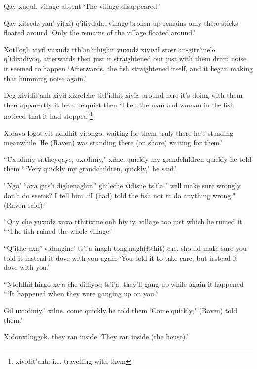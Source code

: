 \documentclass[12pt]{article}
\begin{document}
\gll Qay xuqul.
village absent
\glt `The village disappeared.'
\glend

\gll Qay xitsedz yan' yi(xi) q'itiydala.
village {broken-up remains} only there {sticks floated around}
\glt `Only the remains of the village floated around.'
\glend

\gll Xotl'ogh xiyiɬ yuxudz tth'an'ithighit yuxudz xiviyiɬ srosr an-gitr'inelo q'idixidiyoq.
afterwards then just {it straightened out} just {with them} drum noise {it seemed to happen}
\glt `Afterwards, the fish straightened itself, and it began making that humming noise again.'
\glend

\gll Deg xividit'anh xiyiɬ xizrolche titl'idhit xiyiɬ.
{around here} {it's doing with them} then apparently {it became quiet} then
\glt `Then the man and woman in the fish noticed that it had stopped.'\footnote{xividit'anh:  i.e. travelling with them}
\glend

\gll Xidavo ɬogot yit ndidhit yitongo.
{waiting for them} truly there {he's standing} meanwhile
\glt `He (Raven) was standing there (on shore) waiting for them.'
\glend

\gll ``Uxudiniy sittheyqaye, uxudiniy," xiɬne.
quickly {my grandchildren} quickly {he told them}
\glt ```Very quickly my grandchildren, quickly," he said.'
\glend

\gll ``Ngo' ``axa gits'i dighenaghin'' ghileche vidisne ts'i'a."
well {make sure} wrongly {don't do} {seems?} {I tell him} 
\glt ```I (had) told the fish not to do anything wrong," (Raven said).'
\glend

\gll ``Qay che yuxudz {xaxa tthitixine'onh hiy} iy.
village too just {which he ruined} it
\glt ```The fish ruined the whole village.'
\glend

\gll ``Q'ithe axa'' vidangine' ts'i'a inagh tonginagh(ɬtthit) che.
should {make sure} {you told it} {} instead {it dove with you} again
\glt `You told it to take care, but instead it dove with you.'
\glend

\gll ``Ntoldhiɬ hingo xe'a che didiyoq ts'i'a.
{they'll gang up} while {} again {it happened} 
\glt ```It happened when they were ganging up on you.'
\glend

\gll Gil uxudiniy," xiɬne.
come quickly {he told them}
\glt `Come quickly," (Raven) told them.'
\glend

\gll Xidonxiluggok.
{{they ran inside}}
\glt `They ran inside (the house).'
\glend
\end{document}
